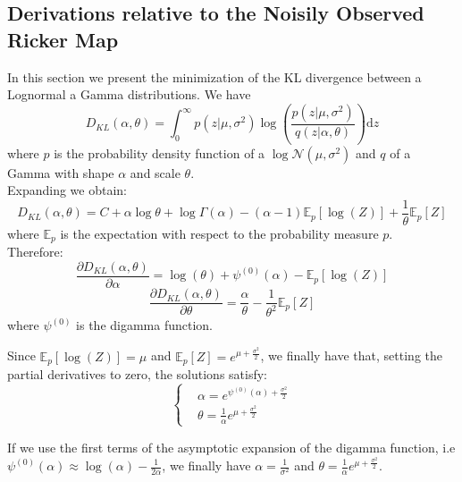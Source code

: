 \documentclass[12pt]{article}
\begin{document}
\begin{appendices}
	\section{Derivations relative to the Noisily Observed Ricker Map} \label{KLRicker}
	In this section we present the minimization of the KL divergence between a Lognormal a Gamma distributions.
	We have
	\begin{equation*}
	D_{KL}(\alpha, \theta) = \int_{0}^{\infty}{p(z|\mu, \sigma^2)\log(\frac{p(z|\mu, \sigma^2)}{q(z|\alpha, \theta)})\mathrm{d}z}
	\end{equation*}
	where $p$ is the probability density function of a $\log\mathcal{N}(\mu, \sigma^2)$ and $q$ of a Gamma with shape $\alpha$ and scale $\theta$. \\
	Expanding we obtain:
	\begin{equation*}
	D_{KL}(\alpha, \theta) = C + \alpha\log\theta + \log\Gamma(\alpha) - (\alpha-1)\mathbb{E}_p[\log(Z)] + \frac{1}{\theta}\mathbb{E}_p[Z]
	\end{equation*}
	where $\mathbb{E}_p$ is the expectation with respect to the probability measure $p$.\\
	Therefore:
	\begin{equation*}
	\frac{\partial D_{KL}(\alpha, \theta)}{\partial \alpha} = \log(\theta) + \psi^{(0)}(\alpha)-\mathbb{E}_p[\log(Z)]
	\end{equation*}
	\begin{equation*}
	\frac{\partial D_{KL}(\alpha, \theta)}{\partial \theta} = \frac{\alpha}{\theta} - \frac{1}{\theta^2}\mathbb{E}_p[Z]
	\end{equation*}
	where $\psi^{(0)}$ is the digamma function.
	
	Since $\mathbb{E}_p[\log(Z)]=\mu$ and $\mathbb{E}_p[Z] = e^{\mu+\frac{\sigma^2}{2}}$, we finally have that, setting the partial derivatives to zero, the solutions satisfy:
	\[	\begin{cases}
	& \alpha=e^{\psi^{(0)}(\alpha)+\frac{\sigma^2}{2}} \\
	& \theta=\frac{1}{\alpha}e^{\mu+\frac{\sigma^2}{2}}
	\end{cases}\]
	
	If we use the first terms of the asymptotic expansion of the digamma function, i.e $\psi^{(0)}(\alpha) \approx \log(\alpha)-\frac{1}{2\alpha}$, we finally have $\alpha =\frac{1}{\sigma^2}$ and $\theta=\frac{1}{\alpha}e^{\mu+\frac{\sigma^2}{2}}$. \\
	

\end{appendices}
\end{document}
